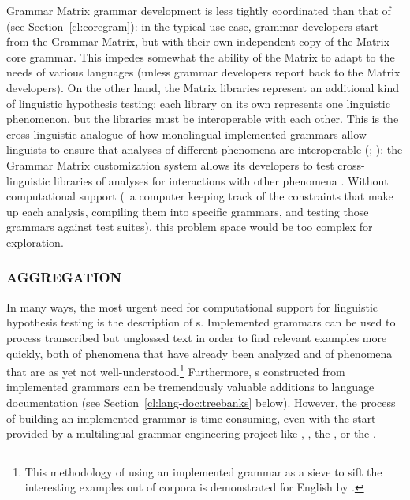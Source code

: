 \documentclass[output=paper
                ,modfonts
                ,nonflat
	        ,collection
	        ,collectionchapter
	        ,collectiontoclongg
 	        ,biblatex
                ,babelshorthands
                ,newtxmath
                ,draftmode
                ,colorlinks, citecolor=brown
]{./langsci/langscibook}
\begin{document}
Grammar Matrix grammar development is less tightly coordinated than
that of  (see Section~\ref{cl:coregram}): in the typical use case,
grammar developers start from the Grammar Matrix, but with their own
independent copy of the Matrix core grammar. This impedes somewhat the
ability of the Matrix to adapt to the needs of various languages
(unless grammar developers report back to the Matrix developers).  On
the other hand, the Matrix libraries represent an additional kind of
linguistic hypothesis testing: each library on its own represents one
linguistic phenomenon, but the libraries must be interoperable with
each other. This is the cross-linguistic analogue of how monolingual
implemented grammars allow linguists to ensure that analyses of
different phenomena are interoperable
(\citealt[439--440]{Mueller99a}; \citealt{Bender2008c}): the Grammar Matrix customization
system allows its developers to test cross-linguistic libraries of
analyses for interactions with other phenomena
\citep{BFO2011a-u,Bender:16}. Without computational
support (\ie\ a computer keeping track of the constraints that
make up each analysis, compiling them into specific grammars, and
testing those grammars against test suites), this problem space
would be too complex for exploration.


\subsubsection{AGGREGATION}
\label{cl:lang-doc:aggr}


In many ways, the most urgent need for computational support for
linguistic hypothesis testing is the description of s. Implemented grammars can be used to process transcribed but
unglossed text in order to find relevant examples more quickly, both
of phenomena that have already been analyzed and of phenomena that are
as yet not well-understood.\footnote{This methodology of using an
  implemented grammar as a sieve to sift the interesting examples out
  of corpora is demonstrated for English by \cite{Baldwin-et-al-05}.}
Furthermore, s constructed from implemented grammars can be
tremendously valuable additions to language documentation (see
Section~\ref{cl:lang-doc:treebanks} below). However, the process of building an
implemented grammar is time-consuming, even with the start provided by
a multilingual grammar engineering project like ,  \citep{BDKMR02a-u,Kin:For:Kuh:But:05}, the  \citep{Ranta:09}, or the
.
\end{document}
